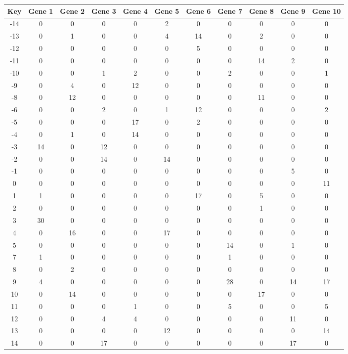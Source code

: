 \begin{tabular}{|c|c|c|c|c|c|c|c|c|c|c|}
\hline
Key & Gene 1 & Gene 2 & Gene 3 & Gene 4 & Gene 5 & Gene 6 & Gene 7 & Gene 8 & Gene 9 & Gene 10 \\
\hline
-14 & 0 & 0 & 0 & 0 & 2 & 0 & 0 & 0 & 0 & 0 \\
-13 & 0 & 1 & 0 & 0 & 4 & 14 & 0 & 2 & 0 & 0 \\
-12 & 0 & 0 & 0 & 0 & 0 & 5 & 0 & 0 & 0 & 0 \\
-11 & 0 & 0 & 0 & 0 & 0 & 0 & 0 & 14 & 2 & 0 \\
-10 & 0 & 0 & 1 & 2 & 0 & 0 & 2 & 0 & 0 & 1 \\
-9 & 0 & 4 & 0 & 12 & 0 & 0 & 0 & 0 & 0 & 0 \\
-8 & 0 & 12 & 0 & 0 & 0 & 0 & 0 & 11 & 0 & 0 \\
-6 & 0 & 0 & 2 & 0 & 1 & 12 & 0 & 0 & 0 & 2 \\
-5 & 0 & 0 & 0 & 17 & 0 & 2 & 0 & 0 & 0 & 0 \\
-4 & 0 & 1 & 0 & 14 & 0 & 0 & 0 & 0 & 0 & 0 \\
-3 & 14 & 0 & 12 & 0 & 0 & 0 & 0 & 0 & 0 & 0 \\
-2 & 0 & 0 & 14 & 0 & 14 & 0 & 0 & 0 & 0 & 0 \\
-1 & 0 & 0 & 0 & 0 & 0 & 0 & 0 & 0 & 5 & 0 \\
0 & 0 & 0 & 0 & 0 & 0 & 0 & 0 & 0 & 0 & 11 \\
1 & 1 & 0 & 0 & 0 & 0 & 17 & 0 & 5 & 0 & 0 \\
2 & 0 & 0 & 0 & 0 & 0 & 0 & 0 & 1 & 0 & 0 \\
3 & 30 & 0 & 0 & 0 & 0 & 0 & 0 & 0 & 0 & 0 \\
4 & 0 & 16 & 0 & 0 & 17 & 0 & 0 & 0 & 0 & 0 \\
5 & 0 & 0 & 0 & 0 & 0 & 0 & 14 & 0 & 1 & 0 \\
7 & 1 & 0 & 0 & 0 & 0 & 0 & 1 & 0 & 0 & 0 \\
8 & 0 & 2 & 0 & 0 & 0 & 0 & 0 & 0 & 0 & 0 \\
9 & 4 & 0 & 0 & 0 & 0 & 0 & 28 & 0 & 14 & 17 \\
10 & 0 & 14 & 0 & 0 & 0 & 0 & 0 & 17 & 0 & 0 \\
11 & 0 & 0 & 0 & 1 & 0 & 0 & 5 & 0 & 0 & 5 \\
12 & 0 & 0 & 4 & 4 & 0 & 0 & 0 & 0 & 11 & 0 \\
13 & 0 & 0 & 0 & 0 & 12 & 0 & 0 & 0 & 0 & 14 \\
14 & 0 & 0 & 17 & 0 & 0 & 0 & 0 & 0 & 17 & 0 \\
\hline
\end{tabular}